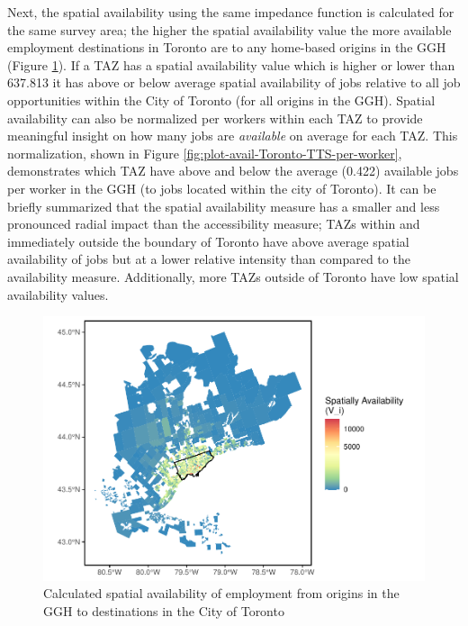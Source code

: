 \documentclass[]{elsarticle} %
\begin{document}
Next, the spatial availability using the same impedance function is
calculated for the same survey area; the higher the spatial availability
value the more available employment destinations in Toronto are to any
home-based origins in the GGH (Figure \ref{fig:plot-avail-Toronto-TTS}).
If a TAZ has a spatial availability value which is higher or lower than
637.813 it has above or below average spatial availability of jobs
relative to all job opportunities within the City of Toronto (for all
origins in the GGH). Spatial availability can also be normalized per
workers within each TAZ to provide meaningful insight on how many jobs
are \emph{available} on average for each TAZ. This normalization, shown
in Figure \ref{fig:plot-avail-Toronto-TTS-per-worker}, demonstrates
which TAZ have above and below the average (0.422) available jobs per
worker in the GGH (to jobs located within the city of Toronto). It can
be briefly summarized that the spatial availability measure has a
smaller and less pronounced radial impact than the accessibility
measure; TAZs within and immediately outside the boundary of Toronto
have above average spatial availability of jobs but at a lower relative
intensity than compared to the availability measure. Additionally, more
TAZs outside of Toronto have low spatial availability values.

\begin{figure}
\includegraphics[width=1\linewidth]{Spatial-Availability_files/figure-latex/plot-avail-Toronto-TTS-1} \caption{\label{fig:plot-avail-Toronto-TTS}Calculated spatial availability of employment from origins in the GGH to destinations in the City of Toronto}\label{fig:plot-avail-Toronto-TTS}
\end{figure}
\end{document}
